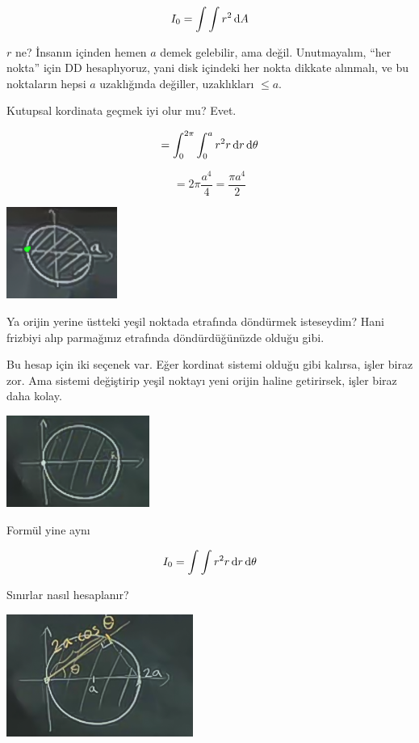 \documentclass[12pt,fleqn]{article}\usepackage{../../common}
\begin{document}
$$ I_0 = \int \int r^2 \,\mathrm{d} A $$

$r$ ne? İnsanın içinden hemen $a$ demek gelebilir, ama değil. Unutmayalım, ``her
nokta'' için DD hesaplıyoruz, yani disk içindeki her nokta dikkate alınmalı, ve
bu noktaların hepsi $a$ uzaklığında değiller, uzaklıkları $\le a$.

Kutupsal kordinata geçmek iyi olur mu? Evet. 

$$ = \int_0^{2\pi} \int_0^a r^2 r \,\mathrm{d} r \,\mathrm{d}\theta $$

$$ = 2\pi \frac{a^4}{4} = \frac{\pi a^4}{2} $$

\begin{center}
\includegraphics[height=3cm]{17_8.png}
\end{center}

Ya orijin yerine üstteki yeşil noktada etrafında döndürmek isteseydim? Hani
frizbiyi alıp parmağınız etrafında döndürdüğünüzde olduğu gibi.

Bu hesap için iki seçenek var. Eğer kordinat sistemi olduğu gibi kalırsa, işler
biraz zor. Ama sistemi değiştirip yeşil noktayı yeni orijin haline getirirsek,
işler biraz daha kolay.

\begin{center}
\includegraphics[height=3cm]{17_9.png}
\end{center}

Formül yine aynı

$$ I_0 = \int \int r^2 r \,\mathrm{d} r \,\mathrm{d}\theta $$

Sınırlar nasıl hesaplanır? 

\begin{center}
\includegraphics[height=4cm]{17_10.png}
\end{center}
\end{document}
